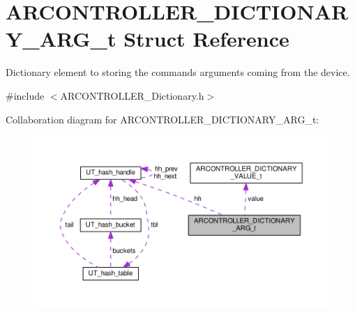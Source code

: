 \hypertarget{struct_a_r_c_o_n_t_r_o_l_l_e_r___d_i_c_t_i_o_n_a_r_y___a_r_g__t}{}\section{A\+R\+C\+O\+N\+T\+R\+O\+L\+L\+E\+R\+\_\+\+D\+I\+C\+T\+I\+O\+N\+A\+R\+Y\+\_\+\+A\+R\+G\+\_\+t Struct Reference}
\label{struct_a_r_c_o_n_t_r_o_l_l_e_r___d_i_c_t_i_o_n_a_r_y___a_r_g__t}


Dictionary element to storing the commands arguments coming from the device.  




{\ttfamily \#include $<$A\+R\+C\+O\+N\+T\+R\+O\+L\+L\+E\+R\+\_\+\+Dictionary.\+h$>$}



Collaboration diagram for A\+R\+C\+O\+N\+T\+R\+O\+L\+L\+E\+R\+\_\+\+D\+I\+C\+T\+I\+O\+N\+A\+R\+Y\+\_\+\+A\+R\+G\+\_\+t\+:
\nopagebreak
\begin{figure}[H]
\begin{center}
\leavevmode
\includegraphics[width=350pt]{struct_a_r_c_o_n_t_r_o_l_l_e_r___d_i_c_t_i_o_n_a_r_y___a_r_g__t__coll__graph}
\end{center}
\end{figure}

